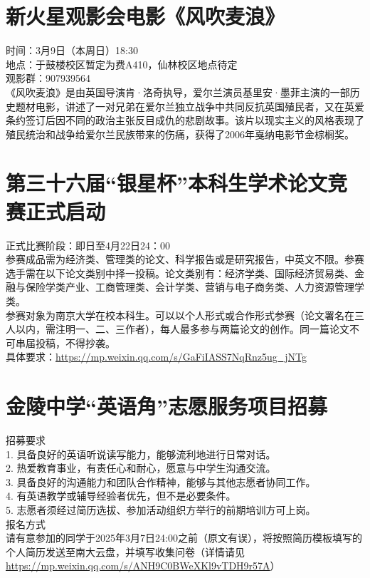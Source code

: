 \documentclass[letterpaper, 12pt]{article}
\begin{document}
\begin{multicols}{2}
\section{新火星观影会电影《风吹麦浪》}
时间：3月9日（本周日）18:30\\
地点：于鼓楼校区暂定为费A410，仙林校区地点待定\\
观影群：907939564\\
《风吹麦浪》是由英国导演肯·洛奇执导，爱尔兰演员基里安·墨菲主演的一部历史题材电影，讲述了一对兄弟在爱尔兰独立战争中共同反抗英国殖民者，又在英爱条约签订后因不同的政治主张反目成仇的悲剧故事。该片以现实主义的风格表现了殖民统治和战争给爱尔兰民族带来的伤痛，获得了2006年戛纳电影节金棕榈奖。\\


\section{第三十六届“银星杯”本科生学术论文竞赛正式启动}
正式比赛阶段：即日至4月22日24：00\\
参赛成品需为经济类、管理类的论文、科学报告或是研究报告，中英文不限。参赛选手需在以下论文类别中择一投稿。论文类别有：经济学类、国际经济贸易类、金融与保险学类产业、工商管理类、会计学类、营销与电子商务类、人力资源管理学类。\\
参赛对象为南京大学在校本科生。可以以个人形式或合作形式参赛（论文署名在三人以内，需注明一、二、三作者），每人最多参与两篇论文的创作。同一篇论文不可串届投稿，不得抄袭。\\
具体要求：\url{https://mp.weixin.qq.com/s/GaFiIASS7NqRnz5ug_jNTg}


\section{金陵中学“英语角”志愿服务项目招募}
招募要求\\
1. 具备良好的英语听说读写能力，能够流利地进行日常对话。\\
2. 热爱教育事业，有责任心和耐心，愿意与中学生沟通交流。\\
3. 具备良好的沟通能力和团队合作精神，能够与其他志愿者协同工作。\\
4. 有英语教学或辅导经验者优先，但不是必要条件。\\
5. 志愿者须经过简历选拔、参加活动组织方举行的前期培训方可上岗。\\
报名方式\\
请有意参加的同学于2025年3月7日24:00之前（原文有误），将按照简历模板填写的个人简历发送至南大云盘，并填写收集问卷（详情请见\url{https://mp.weixin.qq.com/s/ANH9C0BWeXKl9vTDH9r57A}）\\


\end{multicols}
\end{document}
